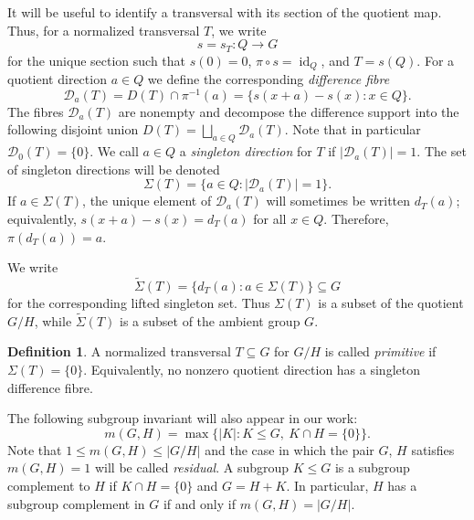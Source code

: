 \documentclass[reqno]{amsart}
\numberwithin{equation}{section}
\theoremstyle{definition}
\newtheorem{definition}[theorem]{Definition}
\begin{document}
It will be useful to identify a transversal with its section of the quotient map.
Thus, for a normalized transversal $T$, we write
\begin{equation} \label{eq:sec}
  s=s_T:Q\longrightarrow G
\end{equation}
for the unique section such that $s(0)=0$, $\pi\circ s=\operatorname{id}_Q$, and
$T=s(Q)$.  For a quotient direction $a\in Q$ we define the corresponding
\emph{difference fibre}
\begin{equation} \label{eq:diff-fibre}
  \mathcal D_a(T)
  =D(T)\cap \pi^{-1}(a)
  =\{s(x+a)-s(x):x\in Q\}.
\end{equation}
The fibres $\mathcal D_a(T)$ are nonempty and decompose the difference support into the following disjoint union
$
  D(T)=\bigsqcup_{a\in Q}\mathcal D_a(T).
$
Note that in particular
$
  \mathcal D_0(T)=\{0\}$.
We call $a\in Q$ a \emph{singleton direction} for $T$ if
$|\mathcal D_a(T)|=1$.  The set of singleton directions will be denoted
\begin{equation} \label{eq:singleton-dir}
  \Sigma(T)=\{a\in Q:|\mathcal D_a(T)|=1\}.
\end{equation}
If $a\in \Sigma(T)$, the unique element of $\mathcal D_a(T)$ will sometimes be
written $d_T(a)$; equivalently,
$
  s(x+a)-s(x)=d_T(a)$ for all  $x\in Q$.
Therefore, $\pi(d_T(a))=a$.

We write
\[
  \widetilde\Sigma(T)=\{d_T(a):a\in\Sigma(T)\}\subseteq G
\]
for the corresponding lifted singleton set.  Thus $\Sigma(T)$ is a subset of
the quotient $G/H$, while $\widetilde\Sigma(T)$ is a subset of the ambient
group $G$.

\begin{definition}
\label{def:primitive-transversal}
A normalized transversal $T \subseteq G$ for $G/H$ is called \emph{primitive} if
  $\Sigma(T)=\{0\}$.
Equivalently, no nonzero quotient direction has a singleton difference fibre.
\end{definition}

The following subgroup invariant will also appear in our work:
\begin{equation} \label{eq:defmGH}
  m(G,H)=\max\{|K|:K\leq G,\ K\cap H=\{0\}\}.
\end{equation}
Note that $1\leq m(G,H)\leq |G/H|$ and the case in which the pair $G$, $H$ satisfies $m(G,H)=1$ will be called
\emph{residual}.  A subgroup $K\leq G$ is a subgroup complement to $H$ if
$K\cap H=\{0\}$ and $G=H+K$.  In particular, $H$ has a subgroup complement in $G$ if and only if
$m(G,H)=|G/H|$.
\end{document}
